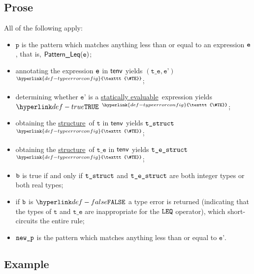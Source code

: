 \documentclass{book}
\newcommand\TypeErrorConfig[0]{\hyperlink{def-typeerrorconfig}{\texttt{\#TE}}}
\newcommand\ProseOrTypeError[0]{\hyperlink{def-proseortypeerror}{$^{\TypeErrorConfig}$}}
\newcommand\structure[0]{\hyperlink{def-structure}{structure}}
\newcommand\staticallyevaluable[0]{\hyperlink{def-staticallyevaluable}{statically evaluable}}
\newcommand\vp[0]{\texttt{p}}
\newcommand\vt[0]{\texttt{t}}
\newcommand\vte[0]{\texttt{t\_e}}
\newcommand\vep[0]{\texttt{e'}}
\begin{document}
\subsection{Prose}
All of the following apply:
\begin{itemize}
\item $\vp$ is the pattern which matches anything less than or equal to an expression $\texttt{e}$,
that is, $\textsf{Pattern\_Leq}(\texttt{e})$;
\item annotating the expression $\texttt{e}$ in $\textsf{tenv}$ yields $(\vte, \vep)$ \ProseOrTypeError;
\item determining whether $\vep$ is a \staticallyevaluable\ expression yields $\True$ \ProseOrTypeError;
\item obtaining the \structure\ of $\vt$ in $\textsf{tenv}$ yields $\texttt{t\_struct}$ \ProseOrTypeError;
\item obtaining the \structure\ of $\vte$ in $\textsf{tenv}$ yields $\texttt{t\_e\_struct}$ \ProseOrTypeError;
\item $\texttt{b}$ is true if and only if $\texttt{t\_struct}$ and $\texttt{t\_e\_struct}$ are both integer types or both real types;
\item if $\texttt{b}$ is $\False$ a type error is returned (indicating that the types of $\vt$ and $\vte$
      are inappropriate for the $\texttt{LEQ}$ operator),
which short-circuits the entire rule;
\item $\texttt{new\_p}$ is the pattern which matches anything less than or equal to $\vep$.
\end{itemize}

\subsection{Example}

\end{document}
